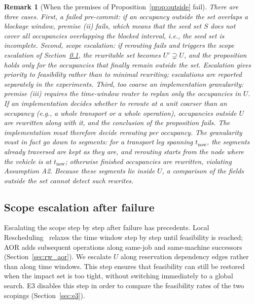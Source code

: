 \documentclass[manuscript,screen,review]{acmart}
\newtheorem{remark}{Remark}
\begin{document}
\begin{remark}[When the premises of Proposition~\ref{prop:outside} fail]
\label{rem:precommit}
There are three cases.
First, a failed pre-commit: if an occupancy outside the set overlaps a blockage window, premise (ii) fails,
which means that the seed set \(S\) does not cover all occupancies overlapping the blocked interval, i.e., the seed set is incomplete.
Second, scope escalation: if rerouting fails and triggers the scope escalation of Section~\ref{sec:scope_escalation},
the rewritable set becomes \(U'\supsetneq U\), and the proposition holds only for the occupancies that finally remain outside the set.
Escalation gives priority to feasibility rather than to minimal rewriting; escalations are reported separately in the experiments.
Third, too coarse an implementation granularity: premise (iii) requires the time-window router to replan \emph{only} the occupancies in \(U\).
If an implementation decides whether to reroute at a unit coarser than an occupancy (e.g., a whole transport or a whole operation), occupancies outside \(U\) are rewritten along with it,
and the conclusion of the proposition fails. The implementation must therefore decide rerouting per occupancy.
The granularity must in fact go down to segments: for a transport leg spanning \(t_{\mathrm{now}}\), the segments already traversed are kept as they are,
and rerouting starts from the node where the vehicle is at \(t_{\mathrm{now}}\); otherwise finished occupancies are rewritten, violating Assumption A2.
Because these segments lie inside \(U\), a comparison of the fields outside the set cannot detect such rewrites.
\end{remark}

\subsection{Scope escalation after failure}
\label{sec:scope_escalation}

Escalating the scope step by step after failure has precedents. Local Rescheduling~\cite{kuster2007local}
relaxes the time window step by step until feasibility is reached; AOR adds subsequent operations along same-job and same-machine successors
(Section~\ref{sec:rw_aor}). We escalate \(U\) along reservation dependency edges rather than along time windows.
This step ensures that feasibility can still be restored when the impact set is too tight, without switching immediately to a global search.
E3 disables this step in order to compare the feasibility rates of the two scopings (Section~\ref{sec:e3}).
\end{document}
